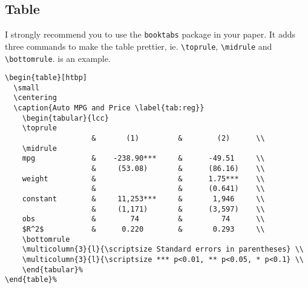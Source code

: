 \documentclass[11pt]{elegantpaper}
\begin{document}
\subsection{Table}
I strongly recommend you to use the \lstinline{booktabs} package in your paper. It adds three commands to make the table prettier, ie. \lstinline{\toprule}, \lstinline{\midrule} and \lstinline{\bottomrule}.  is an example.

\begin{lstlisting}
\begin{table}[htbp]
  \small
  \centering
  \caption{Auto MPG and Price \label{tab:reg}}
    \begin{tabular}{lcc}
    \toprule
                    &       (1)         &        (2)      \\
    \midrule
    mpg             &    -238.90***     &      -49.51     \\
                    &     (53.08)       &      (86.16)    \\
    weight          &                   &      1.75***    \\
                    &                   &      (0.641)    \\
    constant        &     11,253***     &       1,946     \\
                    &     (1,171)       &      (3,597)    \\
    obs             &        74         &         74      \\
    $R^2$           &      0.220        &       0.293     \\
    \bottomrule
    \multicolumn{3}{l}{\scriptsize Standard errors in parentheses} \\
    \multicolumn{3}{l}{\scriptsize *** p<0.01, ** p<0.05, * p<0.1} \\
    \end{tabular}%
\end{table}%
\end{lstlisting}
\end{document}
